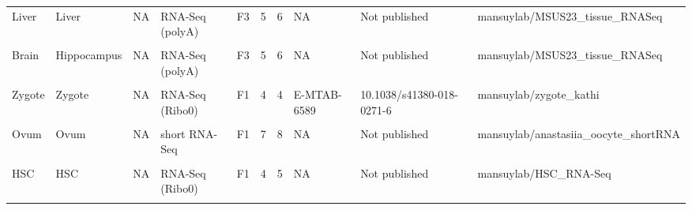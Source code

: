 \documentclass[12pt,twoside]{reedthesis}
\begin{document}
\begin{table}[H]
{\begin{tabular}[t]{lllllrrlll}
Liver & Liver & NA & RNA-Seq (polyA) & F3 & 5 & 6 & NA & Not published & mansuylab/MSUS23\_tissue\_RNASeq\\
\cellcolor{gray!6}{Brain} & \cellcolor{gray!6}{Hippocampus} & \cellcolor{gray!6}{NA} & \cellcolor{gray!6}{RNA-Seq (polyA)} & \cellcolor{gray!6}{F1} & \cellcolor{gray!6}{5} & \cellcolor{gray!6}{5} & \cellcolor{gray!6}{NA} & \cellcolor{gray!6}{Not published} & \cellcolor{gray!6}{mansuylab/MSUS23\_tissue\_RNASeq}\\
Brain & Hippocampus & NA & RNA-Seq (polyA) & F3 & 5 & 6 & NA & Not published & mansuylab/MSUS23\_tissue\_RNASeq\\
\cellcolor{gray!6}{Brain} & \cellcolor{gray!6}{Hypothalamus} & \cellcolor{gray!6}{NA} & \cellcolor{gray!6}{RNA-Seq (polyA)} & \cellcolor{gray!6}{F1} & \cellcolor{gray!6}{17} & \cellcolor{gray!6}{7} & \cellcolor{gray!6}{NA} & \cellcolor{gray!6}{Not published} & \cellcolor{gray!6}{NA}\\
\addlinespace
Zygote & Zygote & NA & RNA-Seq (Ribo0) & F1 & 4 & 4 & E-MTAB-6589 & 10.1038/s41380-018-0271-6 & mansuylab/zygote\_kathi\\
\cellcolor{gray!6}{Embryo} & \cellcolor{gray!6}{Embryo} & \cellcolor{gray!6}{4,6,8 cell} & \cellcolor{gray!6}{RNA-Seq (polyA)} & \cellcolor{gray!6}{F1} & \cellcolor{gray!6}{41} & \cellcolor{gray!6}{36} & \cellcolor{gray!6}{NA} & \cellcolor{gray!6}{Not published} & \cellcolor{gray!6}{mansuylab/embryos\_martin}\\
Ovum & Ovum & NA & short RNA-Seq & F1 & 7 & 8 & NA & Not published & mansuylab/anastasiia\_oocyte\_shortRNA\\
\cellcolor{gray!6}{Cauda} & \cellcolor{gray!6}{Epididymosomes} & \cellcolor{gray!6}{NA} & \cellcolor{gray!6}{short RNA-Seq} & \cellcolor{gray!6}{F1} & \cellcolor{gray!6}{5} & \cellcolor{gray!6}{5} & \cellcolor{gray!6}{GSE175976} & \cellcolor{gray!6}{10.1093/biolre/ioab156} & \cellcolor{gray!6}{mansuylab/alshanbayeva\_et\_al\_2021}\\
HSC & HSC & NA & RNA-Seq (Ribo0) & F1 & 4 & 5 & NA & Not published & mansuylab/HSC\_RNA-Seq\\
\addlinespace
\cellcolor{gray!6}{Uterosomes} & \cellcolor{gray!6}{Uterosomes} & \cellcolor{gray!6}{NA} & \cellcolor{gray!6}{short RNA-Seq} & \cellcolor{gray!6}{F1} & \cellcolor{gray!6}{6} & \cellcolor{gray!6}{6} & \cellcolor{gray!6}{NA} & \cellcolor{gray!6}{Not published} & \cellcolor{gray!6}{mansuylab/uterosomes}\\
\bottomrule
\end{tabular}}
\end{table}
\end{document}
